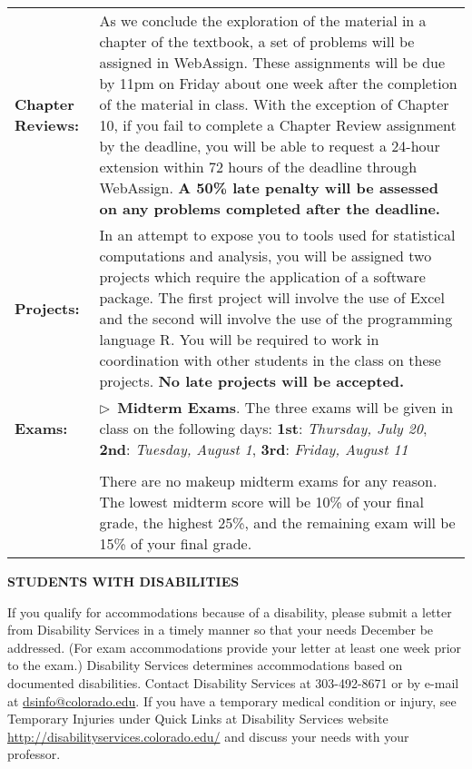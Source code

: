 \documentclass[11pt]{article}
\begin{document}
\begin{longtable}{lp{5.2in}}
\textbf{\parbox[t][1.0in][t]{1.0in}{Chapter Reviews:}}
   & As we conclude the exploration of the material in a chapter of the textbook, a set of problems will be assigned in WebAssign. These assignments will be due by 11pm on Friday about one week after the completion of the material in class. With the exception of Chapter 10, if you fail to complete a Chapter Review assignment by the deadline, you will be able to request a 24-hour extension within 72 hours of the deadline through WebAssign. {\bf A 50\% late penalty will be assessed on any problems completed after the deadline.}
    \\[8pt]

\textbf{Projects:}    
    & In an attempt to expose you to tools used for statistical computations and analysis, you will be assigned two projects which require the application of a software package. The first project will involve the use of Excel and the second will involve the use of the programming language R. You will be required to work in coordination with other students in the class on these projects. {\bf No late projects will be accepted.}
    \\[8pt]

%
\textbf{Exams:}
   & $\triangleright$~\textbf{Midterm Exams}.\/
    \newline
    The three exams will be given in class on the following days:
    \newline
    \textbf{1st}: \textsl{Thursday, July 20},
    \newline
    \textbf{2nd}: \textsl{Tuesday, August 1},
    \newline
    \textbf{3rd}: \textsl{Friday, August 11}
   \\
  \\
  & There are no makeup midterm exams for any reason. The lowest midterm score will be 10\% of your final grade, the highest 25\%, and the remaining exam will be 15\% of your final grade. 
  \\[20pt]


\end{longtable}


\newpage
\normalsize

\textbf{\normalsize STUDENTS WITH DISABILITIES}

\small
If you qualify for accommodations because of a disability, please
submit a letter from Disability Services in a timely manner so
that your needs December be addressed. (For exam accommodations provide your letter at least one week prior to the exam.) Disability Services determines
accommodations based on documented disabilities. Contact Disability 
Services at 303-492-8671 or by e-mail at \url{dsinfo@colorado.edu}.
If you have a temporary medical condition or injury, see Temporary Injuries under Quick Links at
Disability Services website {\footnotesize \url{http://disabilityservices.colorado.edu/}} and discuss your needs with your professor.
\end{document}
